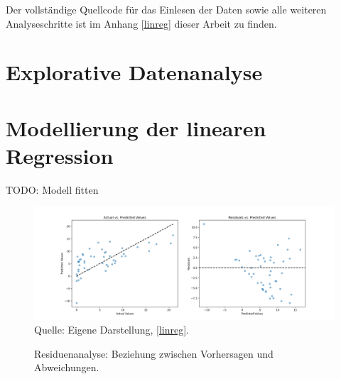 Der vollständige Quellcode für das Einlesen der Daten sowie alle weiteren Analyseschritte ist 
im Anhang \ref{linreg} dieser Arbeit zu finden.

\section{Explorative Datenanalyse}



\section{Modellierung der linearen Regression}

TODO: Modell fitten


\begin{figure}[H]
    \caption{Residuenanalyse: Beziehung zwischen Vorhersagen und Abweichungen.}
    \includegraphics[width=1\textwidth]{../scripts/images/residuals.png}
    Quelle: Eigene Darstellung, \ref{linreg}.
    \label{pic:residuals}
\end{figure}